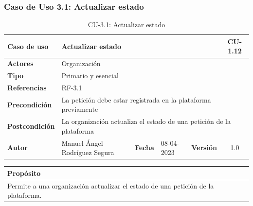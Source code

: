\subsubsection{Caso de Uso 3.1: Actualizar estado}\label{subsubsec:actualizar-estado-peticion}

\begin{table}[H]
    \begin{center}
        \begin{adjustbox}{width=\textwidth}
            \begin{tabular}{ | l | l | l | l | c | c | }
                \hline
                \textbf{Caso de uso} & \multicolumn{4}{l|}{Actualizar estado} & \cellcolor{gray!50} \textbf{CU-1.12}\\
                \hline
                \textbf{Actores} & \multicolumn{5}{p{0.5\linewidth}|}{Organización} \\
                \hline
                \textbf{Tipo} & \multicolumn{5}{l|}{Primario y esencial} \\
                \hline
                \textbf{Referencias} & \multicolumn{3}{l|}{RF-3.1} & \multicolumn{2}{l|}{ }\\
                \hline
                \textbf{Precondición} & \multicolumn{5}{l|}{La petición debe estar registrada en la plataforma previamente} \\
                \hline
                \textbf{Postcondición} & \multicolumn{5}{l|}{La organización actualiza el estado de una petición de la plataforma} \\
                \hline
                \textbf{Autor} & \multicolumn{1}{p{0.25\linewidth}|}{Manuel Ángel Rodríguez Segura} & \textbf{Fecha} &
                08-04-2023     & \textbf{Versión}                                                      & 1.0\\
                \hline
            \end{tabular}
        \end{adjustbox}
        \caption{CU-3.1: Actualizar estado}
        \label{tab:actualizar-estado}
    \end{center}
\end{table}

\begin{table}[H]
    \centering
    \begin{tabularx}{\textwidth}{@{} |L |@{}} \hline
        \textbf{Propósito} \\
        \hline
        Permite a una organización actualizar el estado de una petición de la plataforma. \\
        \hline
    \end{tabularx}
\end{table}

